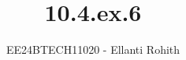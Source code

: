 \documentclass[journal]{IEEEtran}
\begin{document}

\vspace{3cm}

\title{10.4.ex.6}
\author{EE24BTECH11020 - Ellanti Rohith}
{\let\newpage\relax\maketitle}

\renewcommand{\thefigure}{\theenumi}
\renewcommand{\thetable}{\theenumi}
\setlength{\intextsep}{10pt} %


\renewcommand{\thetable}{\theenumi}
\end{document}
